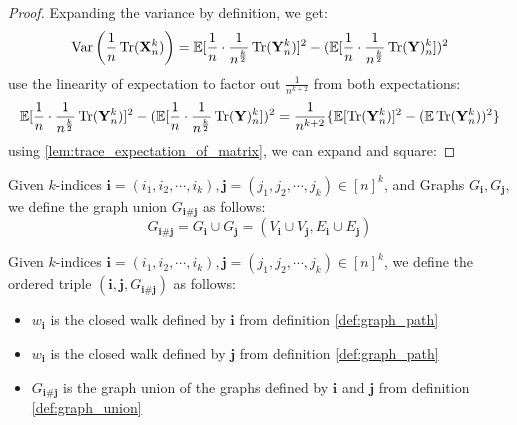 \begin{proof}
    \notready
    Expanding the variance by definition, we get:
    $$
    \operatorname{Var}\left(\frac{1}{n}\operatorname{Tr}(\mathbf{X}_{n}^{k})\right) = \mathbb{E}[\frac{1}{n} \cdot \frac{1}{n^{\frac{k}{2}}} \operatorname{Tr}(\mathbf{Y}_{n}^{k})]^2 - (\mathbb{E}[\frac{1}{n}\cdot \frac{1}{n^{\frac{k}{2}}} \operatorname{Tr}(\mathbf{Y})_{n}^{k}])^2
    $$ 
    use the linearity of expectation to factor out $\frac{1}{n^{k+2}}$ from both expectations:
    $$
    \mathbb{E}[\frac{1}{n} \cdot \frac{1}{n^{\frac{k}{2}}} \operatorname{Tr}(\mathbf{Y}_{n}^{k})]^2 - (\mathbb{E}[\frac{1}{n}\cdot \frac{1}{n^{\frac{k}{2}}} \operatorname{Tr}(\mathbf{Y})_{n}^{k}])^2 = \frac{1}{n^{k+2}} \{\mathbb{E}[\operatorname{Tr}(\mathbf{Y}_{n}^{k})]^2 - (\mathbb{E} \operatorname{Tr}(\mathbf{Y}_{n}^{k}))^2\}
    $$ 
    using \ref{lem:trace_expectation_of_matrix}, we can expand and square:
\end{proof}


\begin{definition}
    \label{def:graph_union}
    \notready
    Given $k$-indices $\mathbf{i} = (i_1, i_2, \cdots , i_{k}), \mathbf{j} = (j_1, j_2, \cdots , j_{k}) \in [n]^{k}$, and Graphs $G_{\mathbf{i}}, G_{\mathbf{j}}$, we define the graph union $G_{\mathbf{i} \# \mathbf{j}}$ as follows:
    $$
    G_{\mathbf{i} \# \mathbf{j}}  = G_{\mathbf{i}} \cup G_{\mathbf{j}} = (V_{\mathbf{i}} \cup V_{\mathbf{j}}, E_{\mathbf{i}} \cup E_{\mathbf{j}})
    $$
\end{definition}


\begin{definition}
    \label{def:ordered_triple}
    \notready
    Given $k$-indices $\mathbf{i} = (i_1, i_2, \cdots , i_{k}), \mathbf{j} = (j_1, j_2, \cdots , j_{k}) \in [n]^{k}$, we define the ordered triple $(\mathbf{i}, \mathbf{j}, G_{\mathbf{i} \# \mathbf{j}})$ as follows:
    \begin{itemize}
        \item $w_{\mathbf{i}}$ is the closed walk defined by $\mathbf{i}$ from definition \ref{def:graph_path}
        \item $w_{\mathbf{i}}$ is the closed walk defined by $\mathbf{j}$ from definition \ref{def:graph_path}
        \item $G_{\mathbf{i} \# \mathbf{j}}$ is the graph union of the graphs defined by $\mathbf{i}$ and $\mathbf{j}$ from definition \ref{def:graph_union}
    \end{itemize}
\end{definition}

